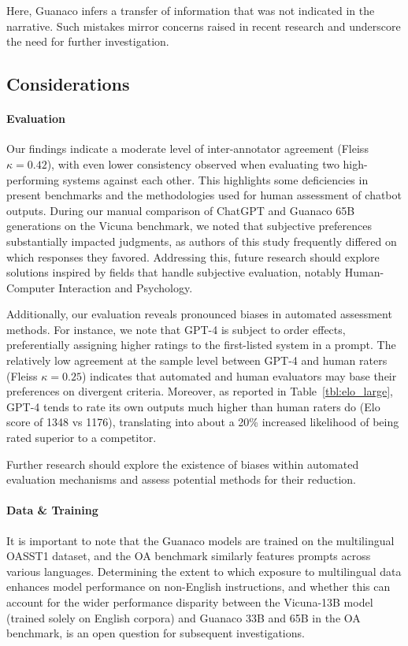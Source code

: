 Here, {Guanaco} infers a transfer of information that was not indicated in the narrative. Such mistakes mirror concerns raised in recent research \cite{sap2022neural} and underscore the need for further investigation.

\subsection{Considerations}
\label{ssec:considerations}

\paragraph{Evaluation}

Our findings indicate a moderate level of inter-annotator agreement (Fleiss $\kappa=0.42$), with even lower consistency observed when evaluating two high-performing systems against each other. This highlights some deficiencies in present benchmarks and the methodologies used for human assessment of chatbot outputs. During our manual comparison of ChatGPT and {Guanaco} 65B generations on the Vicuna benchmark, we noted that subjective preferences substantially impacted judgments, as authors of this study frequently differed on which responses they favored. Addressing this, future research should explore solutions inspired by fields that handle subjective evaluation, notably Human-Computer Interaction and Psychology.

Additionally, our evaluation reveals pronounced biases in automated assessment methods. For instance, we note that GPT-4 is subject to order effects, preferentially assigning higher ratings to the first-listed system in a prompt. The relatively low agreement at the sample level between GPT-4 and human raters (Fleiss $\kappa=0.25$) indicates that automated and human evaluators may base their preferences on divergent criteria. Moreover, as reported in Table~\ref{tbl:elo_large}, GPT-4 tends to rate its own outputs much higher than human raters do (Elo score of 1348 vs 1176), translating into about a 20\% increased likelihood of being rated superior to a competitor.

Further research should explore the existence of biases within automated evaluation mechanisms and assess potential methods for their reduction.

\paragraph{Data \& Training} It is important to note that the {Guanaco} models are trained on the multilingual OASST1 dataset, and the OA benchmark similarly features prompts across various languages. Determining the extent to which exposure to multilingual data enhances model performance on non-English instructions, and whether this can account for the wider performance disparity between the Vicuna-13B model (trained solely on English corpora) and {Guanaco} 33B and 65B in the OA benchmark, is an open question for subsequent investigations.

